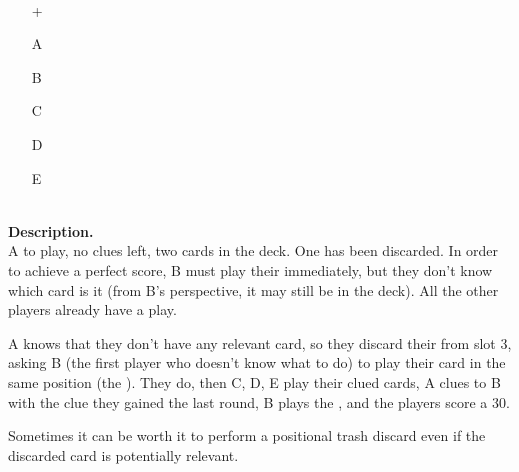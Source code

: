 \begin{example}	\hfill \\
	\begin{minipage}{0.45\textwidth}
		\begin{itemize}
			\item[\Large +]      
			\item[\Large A]    
			\item[\Large B]    
			\item[\Large C]    
			\item[\Large D]    
			\item[\Large E]    
		\end{itemize}
	\end{minipage}%
	\begin{minipage}{0.55\textwidth}
		\hfill \\
		
		\textbf{Description.} \\
		
		A to play, no clues left, two cards in the deck. One  has been discarded. In order to achieve a perfect score, B must play their  immediately, but they don't know which card is it (from B's perspective, it may still be in the deck). All the other players already have a play.
		
		A knows that they don't have any relevant card, so they discard their  from slot 3, asking B (the first player who doesn't know what to do) to play their card in the same position (the ). They do, then C, D, E play their clued cards, A clues  to B with the clue they gained the last round, B plays the , and the players score a 30.
	\end{minipage}
\end{example} \vspace{0.15 cm}

Sometimes it can be worth it to perform a positional trash discard even if the discarded card is potentially relevant.

